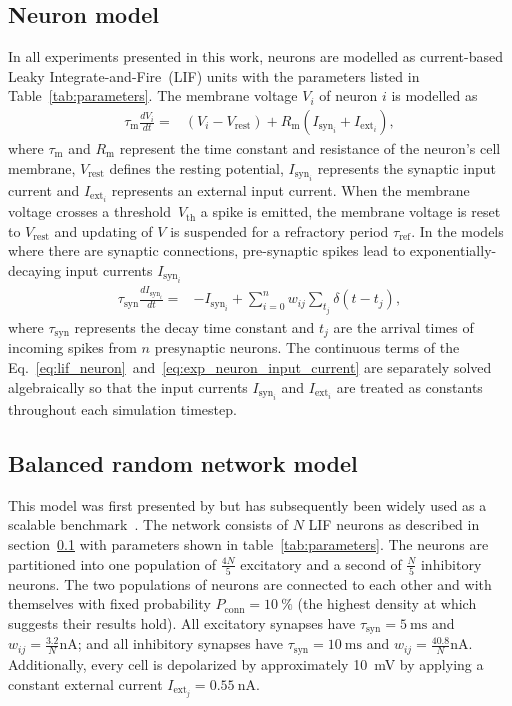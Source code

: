\documentclass[9pt,a4paper]{amsart}
\begin{document}
\subsection{Neuron model}
\label{sec:methods/neuron_model}
In all experiments presented in this work, neurons are modelled as current-based Leaky Integrate-and-Fire~(LIF) units with the parameters listed in Table~\ref{tab:parameters}.
The membrane voltage $V_{i}$ of neuron $i$ is modelled as
%
\begin{align}
    \tau_{\text{m}} \frac{dV_{i}}{dt} = & (V_{i} - V_{\text{rest}}) + R_{\text{m}}(I_{\text{syn}_{i}} + I_{\text{ext}_{i}}), \label{eq:lif_neuron}
\end{align}
%
where $\tau_{\text{m}}$ and $R_{\text{m}}$ represent the time constant and resistance of the neuron's cell membrane, $V_{\text{rest}}$ defines the resting potential, $I_{\text{syn}_{i}}$ represents the synaptic input current and $I_{\text{ext}_i}$ represents an external input current.
When the membrane voltage crosses a threshold~$V_{\text{th}}$ a spike is emitted, the membrane voltage is reset to $V_{\text{rest}}$ and updating of $V$ is suspended for a refractory period $\tau_{\text{ref}}$.
In the models where there are synaptic connections, pre-synaptic spikes lead to exponentially-decaying input currents $I_{\text{syn}_{i}}$
%
\begin{align}
    \tau_{\text{syn}} \frac{dI_{\text{syn}_{i}}}{dt} = & -I_{\text{syn}_{i}} + \sum_{i=0}^{n} w_{ij} \sum_{t_{j}}  \delta(t - t_{j}),\label{eq:exp_neuron_input_current}
\end{align}
%
where $\tau_{\text{syn}}$ represents the decay time constant and $t_{j}$ are the arrival times of incoming spikes from $n$ presynaptic neurons.
The continuous terms of the Eq.~\ref{eq:lif_neuron}~and~\ref{eq:exp_neuron_input_current} are separately solved algebraically so that the input currents $I_{\text{syn}_{i}}$ and $I_{\text{ext}_{i}}$ are treated as constants throughout each simulation timestep.

\subsection{Balanced random network model}
\label{sec:methods/va_benchmark}
This model was first presented by \citet{Vogels2005} but has subsequently been widely used as a scalable benchmark~\citep{Brette2007}.
The network consists of $N$ LIF neurons as described in section~\ref{sec:methods/neuron_model} with parameters shown in table~\ref{tab:parameters}.
The neurons are partitioned into one population of $\frac{4N}{5}$ excitatory and a second of $\frac{N}{5}$ inhibitory neurons.
The two populations of neurons are connected to each other and with themselves with fixed probability $P_{\text{conn}}=\SI{10}{\percent}$ (the highest density at which \citet{Vogels2005} suggests their results hold).
All excitatory synapses have $\tau_{\text{syn}}=\SI{5}{\milli\second}$ and $w_{ij}=\frac{3.2}{N}\si{\nano\ampere}$; and all inhibitory synapses have $\tau_{\text{syn}}=\SI{10}{\milli\second}$ and $w_{ij}=\frac{40.8}{N}\si{\nano\ampere}$.
Additionally, every cell is depolarized by approximately \SI{10}{\milli\volt} by applying a constant external current $I_{\text{ext}_j}= \SI{0.55}{\nano\ampere}$.
\end{document}
